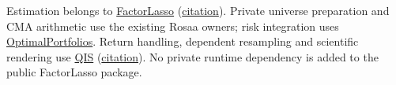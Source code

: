 \documentclass[a4paper,review]{cas-sc}
\begin{document}
Estimation belongs to \href{https://github.com/ArturSepp/FactorLasso}{FactorLasso} (\href{https://github.com/ArturSepp/FactorLasso/blob/main/CITATION.cff}{citation}). Private universe preparation and CMA arithmetic use the existing Rosaa owners; risk integration uses \href{https://github.com/ArturSepp/OptimalPortfolios}{OptimalPortfolios}. Return handling, dependent resampling and scientific rendering use \href{https://github.com/ArturSepp/QuantInvestStrats}{QIS} (\href{https://github.com/ArturSepp/QuantInvestStrats/blob/main/CITATION.cff}{citation}). No private runtime dependency is added to the public FactorLasso package.
\FloatBarrier
\begingroup
{}


\endgroup
\end{document}
